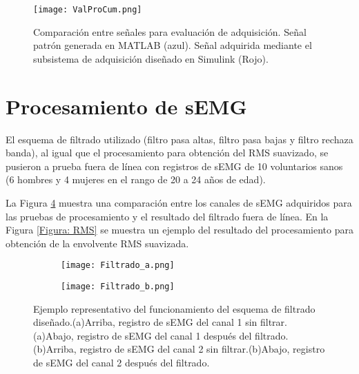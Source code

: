 \begin{figure}[htbp]
	\centering
	\texttt{[image: ValProCum.png]}
	\caption[Comparación entre señales para evaluación de adquisición.]{Comparación entre señales para evaluación de adquisición. Señal patrón generada en MATLAB\textregistered \; (azul). Señal adquirida mediante el subsistema de adquisición diseñado en Simulink\textregistered \; (Rojo).}
	\label{Figura: ValProCum}
\end{figure}

\newpage
\section{Procesamiento de sEMG}
El esquema de filtrado utilizado (filtro pasa altas, filtro pasa bajas y filtro rechaza banda), al igual que el procesamiento para obtención del RMS suavizado, se pusieron a prueba fuera de línea con registros de sEMG de 10 voluntarios sanos (6 hombres y 4 mujeres en el rango de 20 a 24 años de edad).

La Figura \ref{Figura: Filtrado} muestra una comparación entre los canales de sEMG adquiridos para las pruebas de procesamiento y el resultado del filtrado fuera de línea. En la Figura \ref{Figura: RMS} se muestra un ejemplo del resultado del procesamiento para obtención de la envolvente RMS suavizada.


\begin{figure}[htbp]
	\centering
	\begin{subfigure}[htbp]{0.45\textwidth}
		\texttt{[image: Filtrado\_a.png]}
		\caption{}
		\label{Figura: Filtrado_a}
	\end{subfigure}
	\hfill
	\begin{subfigure}[htbp]{0.45\textwidth}
		\texttt{[image: Filtrado\_b.png]}
		\caption{}
		\label{Figura: Filtrado_b}
	\end{subfigure}	
	\caption[Ejemplo representativo del funcionamiento del esquema de filtrado diseñado]{Ejemplo representativo del funcionamiento del esquema de filtrado diseñado.(a)Arriba, registro de sEMG del canal 1 sin filtrar.(a)Abajo, registro de sEMG del canal 1 después del filtrado.(b)Arriba, registro de sEMG del canal 2 sin filtrar.(b)Abajo, registro de sEMG del canal 2 después del filtrado.}
	\label{Figura: Filtrado}
\end{figure}

